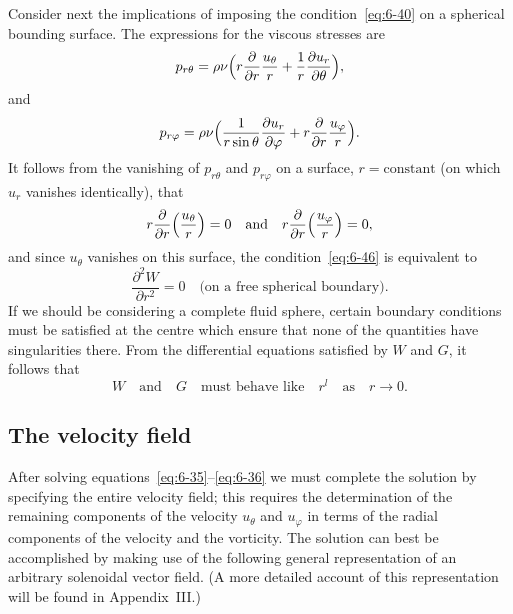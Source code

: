 Consider next the implications of imposing the condition~\eqref{eq:6-40} on a
spherical bounding surface. The expressions for the viscous stresses
are
\begin{equation}\label{eq:6-44}
p_{r\theta} = \rho\nu\Bigl(r\frac{\partial}{\partial r}\frac{u_\theta}{r} + \frac{1}{r}\frac{\partial u_r}{\partial\theta}\Bigr),
\end{equation}
and
\begin{equation}\label{eq:6-45}
p_{r\varphi} = \rho\nu\Bigl(\frac{1}{r\sin\theta}\frac{\partial u_r}{\partial\varphi} + r\frac{\partial}{\partial r}\frac{u_\varphi}{r}\Bigr).
\end{equation}
It follows from the vanishing of $p_{r\theta}$ and $p_{r\varphi}$ on a surface, $r = \text{constant}$
(on which $u_r$ vanishes identically), that
\begin{equation}\label{eq:6-46}
r\frac{\partial}{\partial r}\Bigl(\frac{u_\theta}{r}\Bigr) = 0 \quad\text{and}\quad r\frac{\partial}{\partial r}\Bigl(\frac{u_\varphi}{r}\Bigr) = 0,
\end{equation}
and since $u_\theta$ vanishes on this surface, the condition~\eqref{eq:6-46} is equivalent to
\begin{equation}\label{eq:6-47}
\frac{\partial^2 W}{\partial r^2} = 0 \quad\text{(on a free spherical boundary)}.
\end{equation}
If we should be considering a complete fluid sphere, certain boundary
conditions must be satisfied at the centre which ensure that none of the
quantities have singularities there. From the differential equations
satisfied by $W$ and $G$, it follows that
\begin{equation}\label{eq:6-48}
W \quad\text{and}\quad G\quad\text{must behave like}\quad r^l \quad\text{as}\quad r \to 0.
\end{equation}

\subsection{The velocity field}\label{sec:56d}
After solving equations~\eqref{eq:6-35}--\eqref{eq:6-36} we must complete the solution by
specifying the entire velocity field; this requires the determination of
the remaining components of the velocity $u_\theta$ and $u_\varphi$ in terms of the radial
components of the velocity and the vorticity. The solution can best
be accomplished by making use of the following general representation
of an arbitrary solenoidal vector field. (A more detailed account
of this representation will be found in Appendix~III.)

